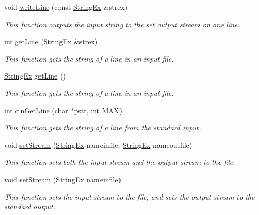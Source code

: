 \begin{CompactItemize}
\item 
void \hyperlink{classkmaOrange_1_1StrStream_04f651a33a14034c003763cd46ce7920}{writeLine} (const \hyperlink{classStringEx}{StringEx} \&strex)
\begin{CompactList}\small\item\em This function outputs the input string to the set output stream on one line. \item\end{CompactList}\item 
int \hyperlink{classkmaOrange_1_1StrStream_c61d2e7c94badd87624c973a1682096a}{getLine} (\hyperlink{classStringEx}{StringEx} \&strex)
\begin{CompactList}\small\item\em This function gets the string of a line in an input file. \item\end{CompactList}\item 
\hyperlink{classStringEx}{StringEx} \hyperlink{classkmaOrange_1_1StrStream_2a65fe8f2e6a748e719f24a5ba415074}{getLine} ()
\begin{CompactList}\small\item\em This function gets the string of a line in an input file. \item\end{CompactList}\item 
int \hyperlink{classkmaOrange_1_1StrStream_8f51bbfc68c5f84a299134f7c85097da}{cinGetLine} (char $\ast$pstr, int MAX)
\begin{CompactList}\small\item\em This function gets the string of a line from the standard input. \item\end{CompactList}\item 
void \hyperlink{classkmaOrange_1_1StrStream_6a1562a9ccdd5ca9c935a904aa27e250}{setStream} (\hyperlink{classStringEx}{StringEx} nameinfile, \hyperlink{classStringEx}{StringEx} nameoutfile)
\begin{CompactList}\small\item\em This function sets both the input stream and the output stream to the file. \item\end{CompactList}\item 
void \hyperlink{classkmaOrange_1_1StrStream_d2fc861331ed65e13c09eaf55b4456d8}{setStream} (\hyperlink{classStringEx}{StringEx} nameinfile)
\begin{CompactList}\small\item\em This function sets the input stream to the file, and sets the output stream to the standard output. \item\end{CompactList}\item 

\end{CompactItemize}
